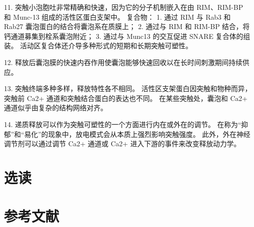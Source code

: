 11. 突触小泡胞吐非常精确和快速，因为它的分子机制嵌入在由 RIM、RIM-BP 和 Munc-13 组成的活性区蛋白支架中。 复合物： 1. 通过 RIM 与 Rab3 和 Rab27 囊泡蛋白的结合将囊泡系在质膜上； 2. 通过与 RIM 和 RIM-BP 结合，将钙通道募集到栓系囊泡附近； 3. 通过与 Munc13 的交互促进 SNARE 复合体的组装。 活动区复合体还介导多种形式的短期和长期突触可塑性。 

12. 释放后囊泡膜的快速内吞作用使囊泡能够快速回收以在长时间刺激期间持续供应。 

13. 突触终端多种多样，释放特性各不相同。 活性区支架蛋白因突触和物种而异，突触前 Ca2+ 通道和突触结合蛋白的表达也不同。 在某些突触处，囊泡和 Ca2+ 通道似乎由复杂的结构网络对齐。 

14. 递质释放可以作为突触可塑性的一个方面进行内在或外在的调节。 在称为“抑郁”和“易化”的现象中，放电模式会从本质上强烈影响突触强度。 此外，外在神经调节剂可以通过调节 Ca2+ 通道或 Ca2+ 进入下游的事件来改变释放动力学。

\section{选读}

\section{参考文献}

